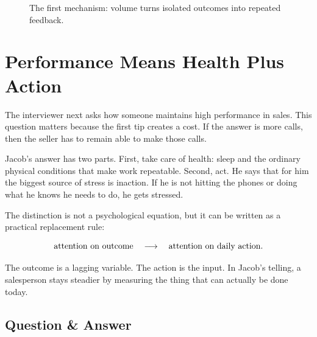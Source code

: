 \begin{figure}
\centering
{}
\caption{The first mechanism: volume turns isolated outcomes into repeated feedback.}
\end{figure}

\section{Performance Means Health Plus Action}

The interviewer next asks how someone maintains high performance in sales. This question matters because the first tip creates a cost. If the answer is more calls, then the seller has to remain able to make those calls.

Jacob's answer has two parts. First, take care of health: sleep and the ordinary physical conditions that make work repeatable. Second, act. He says that for him the biggest source of stress is inaction. If he is not hitting the phones or doing what he knows he needs to do, he gets stressed.

The distinction is not a psychological equation, but it can be written as a practical replacement rule:

\begin{equation}
\hbox{attention on outcome}
\quad \longrightarrow \quad
\hbox{attention on daily action}.
\end{equation}

The outcome is a lagging variable. The action is the input. In Jacob's telling, a salesperson stays steadier by measuring the thing that can actually be done today.

\subsection{Question \& Answer}

